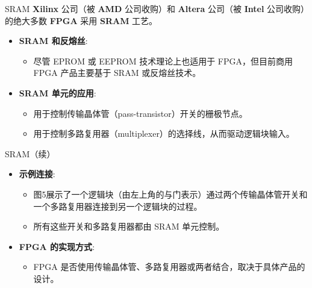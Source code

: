 \documentclass[
  ignorenonframetext,
  chinese,
]{beamer}
\providecommand{\tightlist}{%
  \setlength{\itemsep}{0pt}\setlength{\parskip}{0pt}}
\begin{document}
\begin{frame}
\begin{block}{SRAM}
\label{sram}
\textbf{Xilinx} 公司（被 \textbf{AMD} 公司收购）和 \textbf{Altera}
公司（被 \textbf{Intel} 公司收购）的绝大多数 \textbf{FPGA} 采用
\textbf{SRAM} 工艺。

\begin{itemize}
\tightlist
\item
  \textbf{SRAM 和反熔丝}:

  \begin{itemize}
  \tightlist
  \item
    尽管 EPROM 或 EEPROM 技术理论上也适用于 FPGA，但目前商用 FPGA
    产品主要基于 SRAM 或反熔丝技术。
  \end{itemize}
\item
  \textbf{SRAM 单元的应用}:

  \begin{itemize}
  \tightlist
  \item
    用于控制传输晶体管（pass-transistor）开关的栅极节点。
  \item
    用于控制多路复用器（multiplexer）的选择线，从而驱动逻辑块输入。
  \end{itemize}
\end{itemize}
\end{block}
\end{frame}

\begin{frame}
\begin{block}{SRAM（续）}
\begin{itemize}
\tightlist
\item
  \textbf{示例连接}:

  \begin{itemize}
  \tightlist
  \item
    图5展示了一个逻辑块（由左上角的与门表示）通过两个传输晶体管开关和一个多路复用器连接到另一个逻辑块的过程。
  \item
    所有这些开关和多路复用器都由 SRAM 单元控制。
  \end{itemize}
\item
  \textbf{FPGA 的实现方式}:

  \begin{itemize}
  \tightlist
  \item
    FPGA
    是否使用传输晶体管、多路复用器或两者结合，取决于具体产品的设计。
  \end{itemize}
\end{itemize}
\end{block}
\end{frame}
\end{document}
